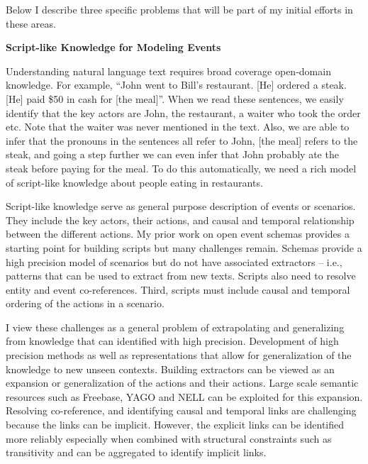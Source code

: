 \documentclass[a4paper,11pt,onecolumn]{article}
\begin{document}
Below I describe three specific problems that will be part of my initial efforts in these areas.

{\bf Script-like Knowledge for Modeling Events}

Understanding natural language text requires broad coverage open-domain knowledge. For example, ``John went to Bill's restaurant. [He] ordered a steak. [He] paid \$50 in cash for [the meal]''. When we read these sentences, we easily identify that the key actors are John, the restaurant, a waiter who took the order etc. Note that the waiter was never mentioned in the text. Also, we are able to infer that the pronouns in the sentences all refer to John, [the meal] refers to the steak, and going a step further we can even infer that John probably ate the steak before paying for the meal. To do this automatically, we need a rich model of script-like knowledge about people eating in restaurants.

Script-like knowledge serve as general purpose description of events or scenarios. They include the key actors, their actions, and causal and temporal relationship between the different actions. My prior work on open event schemas provides a starting point for building scripts but many challenges remain. Schemas provide a high precision model of scenarios but do not have associated extractors -- i.e., patterns that can be used to extract from new texts. 
Scripts also need to resolve entity and event co-references. Third, scripts must include causal and temporal ordering of the actions in a scenario. 

I view these challenges as a general problem of extrapolating and generalizing from knowledge that can identified with high precision. Development of high precision methods as well as representations that allow for generalization of the knowledge to new unseen contexts. Building extractors can be viewed as an expansion or generalization of the actions and their actions. Large scale semantic resources such as Freebase, YAGO and NELL can be exploited for this expansion. Resolving co-reference, and identifying causal and temporal links are challenging because the links can be implicit. However, the explicit links can be identified more reliably especially when combined with structural constraints such as transitivity and can be aggregated to identify implicit links. 
\end{document}

